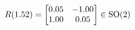\documentclass[preview]{standalone}
\begin{document}
\begin{align*}
\special{dvisvgm:raw <g id='unique000'>}R(1.52) = \begin{bmatrix} 0.05 & -1.00 \\ 1.00 & 0.05 \end{bmatrix} \in \text{SO}(2)\special{dvisvgm:raw </g>}
\end{align*}
\end{document}
